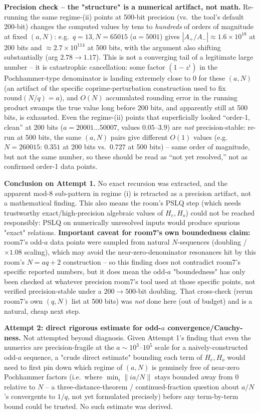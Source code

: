 \textbf{Precision check -- the "structure" is a numerical artifact, not math.} Re-running the
same regime-(ii) points at 500-bit precision (vs.\ the tool's default 200-bit) changes the
computed values by tens to \emph{hundreds} of orders of magnitude at fixed $(a,N)$: e.g.\ $q=13,
N=65015$ ($a=5001$) gives $|A_+/A_-|\approx1.6\times10^{18}$ at 200 bits and
$\approx2.7\times10^{114}$ at 500 bits, with the argument also shifting substantially (arg
$2.78\to1.17$). This is not a converging tail of a legitimate large number -- it is catastrophic
cancellation: some factor $(1-z^i)$ in the Pochhammer-type denominator is landing extremely close
to $0$ for these $(a,N)$ (an artifact of the specific coprime-perturbation construction used to
fix $\mathrm{round}(N/q)=a$), and $O(N)$ accumulated rounding error in the running product swamps
the true value long before 200 bits, and apparently still at 500 bits, is exhausted. Even the
regime-(ii) points that superficially looked ``order-1, clean'' at 200 bits ($a=20001\dots50007$,
values $0.05$--$3.9$) are \emph{not} precision-stable: re-run at 500 bits, the same $(a,N)$ pairs
give different $O(1)$ values (e.g.\ $N=260015$: $0.351$ at 200 bits vs.\ $0.727$ at 500 bits) --
same order of magnitude, but not the same number, so these should be read as ``not yet resolved,''
not as confirmed order-1 data points.

\textbf{Conclusion on Attempt 1.} No exact recursion was extracted, and the apparent mod-8
sub-pattern in regime (i) is retracted as a precision artifact, not a mathematical finding. This
also means the room's PSLQ step (which needs trustworthy exact/high-precision algebraic values of
$H_e,H_o$) could not be reached responsibly: PSLQ on numerically unresolved inputs would produce
spurious "exact" relations. \textbf{Important caveat for room7's own boundedness claim:} room7's
odd-$a$ data points were sampled from natural $N$-sequences (doubling / $\times1.08$ scaling),
which may avoid the near-zero-denominator resonances hit by this room's $N=aq+2$ construction --
so this finding does not contradict room7's specific reported numbers, but it does mean the
odd-$a$ "boundedness" has only been checked at whatever precision room7's tool used at those
specific points, not verified precision-stable under a $200\to500$-bit doubling. That
cross-check (rerun room7's own $(q,N)$ list at 500 bits) was \emph{not} done here (out of budget)
and is a natural, cheap next step.

\textbf{Attempt 2: direct rigorous estimate for odd-$a$ convergence/Cauchy-ness.} Not attempted
beyond diagnosis. Given Attempt 1's finding that even the numerics are precision-fragile at the
$a\sim10^3$--$10^5$ scale for a naively-constructed odd-$a$ sequence, a "crude direct estimate"
bounding each term of $H_e,H_o$ would need to first pin down which regime of $(a,N)$ is genuinely
free of near-zero Pochhammer factors (i.e.\ where $\min_i \|ia/N\|$ stays bounded away from $0$
relative to $N$ -- a three-distance-theorem / continued-fraction question about $a/N$'s
convergents to $1/q$, not yet formulated precisely) before any term-by-term bound could be
trusted. No such estimate was derived.

